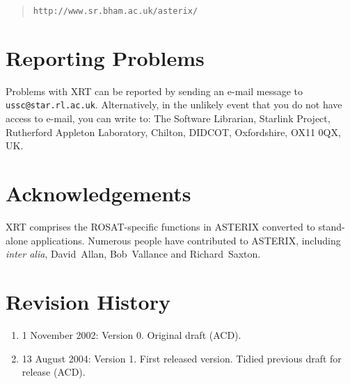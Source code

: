 \documentclass[twoside,11pt]{article}
\newcommand{\htmladdnormallink}[2]{#1}
\newcommand{\xlabel}[1]{}
\renewcommand{\_}{\texttt{\symbol{95}}}
\begin{document}
\begin{quote}
\htmladdnormallink{{\tt http://www.sr.bham.ac.uk/asterix/}}
{http://www.sr.bham.ac.uk/asterix/}
\end{quote}


\section{\xlabel{PROBLEMS}\label{PROBLEMS}Reporting Problems}

Problems with XRT can be reported by sending an e-mail message to {\tt
ussc@star.rl.ac.uk}.  Alternatively, in the unlikely event that you do not
have access to e-mail, you can write to: The Software Librarian, Starlink
Project, Rutherford Appleton Laboratory, Chilton, DIDCOT, Oxfordshire,
OX11 0QX, UK.


\section{\xlabel{ACK}\label{ACK}Acknowledgements}

XRT comprises the ROSAT-specific functions in ASTERIX converted to
stand-alone applications.  Numerous people have contributed to ASTERIX,
including {\it inter alia}, David~Allan, Bob~Vallance and Richard~Saxton.


\section{\xlabel{REV}\label{REV}Revision History}

\begin{enumerate}

  \item 1 November 2002: Version 0.  Original draft (ACD).

  \item 13 August 2004: Version 1.  First released version.  Tidied
   previous draft for release (ACD).

\end{enumerate}



\typeout{  }
\typeout{*****************************************************}
\typeout{  }
\typeout{  }
\typeout{*****************************************************}
\typeout{  }
\end{document}
